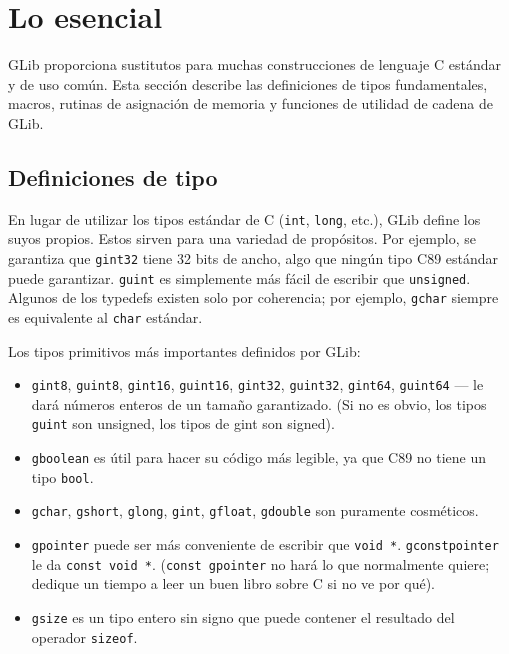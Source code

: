 \section{Lo esencial}

GLib proporciona sustitutos para muchas construcciones de lenguaje C estándar y de uso común. Esta sección describe las definiciones de tipos fundamentales, macros, rutinas de asignación de memoria y funciones de utilidad de cadena de GLib.

\subsection{Definiciones de tipo}

En lugar de utilizar los tipos estándar de C (\lstinline{int}, \lstinline{long}, etc.), GLib define los suyos propios. Estos sirven para una variedad de propósitos. Por ejemplo, se garantiza que \lstinline{gint32} tiene 32 bits de ancho, algo que ningún tipo C89 estándar puede garantizar. \lstinline{guint} es simplemente más fácil de escribir que \lstinline{unsigned}. Algunos de los typedefs existen solo por coherencia; por ejemplo, \lstinline{gchar} siempre es equivalente al \lstinline{char} estándar.

Los tipos primitivos más importantes definidos por GLib:
\begin{itemize}
    \item \lstinline{gint8}, \lstinline{guint8}, \lstinline{gint16}, \lstinline{guint16}, \lstinline{gint32}, \lstinline{guint32}, \lstinline{gint64}, \lstinline{guint64} --- le dará números enteros de un tamaño garantizado. (Si no es obvio, los tipos \lstinline{guint} son unsigned, los tipos de gint son signed).
    
    \item \lstinline{gboolean} es útil para hacer su código más legible, ya que C89 no tiene un tipo \lstinline{bool}.
    
    \item \lstinline{gchar}, \lstinline{gshort}, \lstinline{glong}, \lstinline{gint}, \lstinline{gfloat}, \lstinline{gdouble} son puramente cosméticos.
    
    \item \lstinline{gpointer} puede ser más conveniente de escribir que \lstinline{void *}. \lstinline{gconstpointer} le da \lstinline{const void *}. (\lstinline{const gpointer} no hará lo que normalmente quiere; dedique un tiempo a leer un buen libro sobre C si no ve por qué).
    
    \item \lstinline{gsize} es un tipo entero sin signo que puede contener el resultado del operador \lstinline{sizeof}.
\end{itemize}

